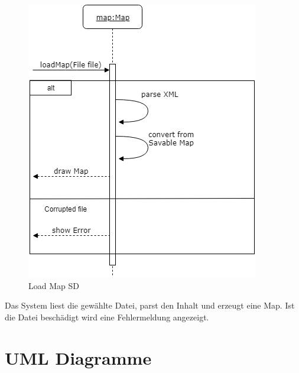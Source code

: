 \begin{figure}[H]
	\centering
		\includegraphics[scale=0.6]{images/loadmapSD.png}
	\caption{Load Map SD}
	\label{fig:loadmap_SD}
\end{figure}
Das System liest die gewählte Datei, parst den Inhalt und erzeugt eine Map. Ist die Datei beschädigt wird eine Fehlermeldung angezeigt.

\section{UML Diagramme}
\label{sec:uml_diagramme}